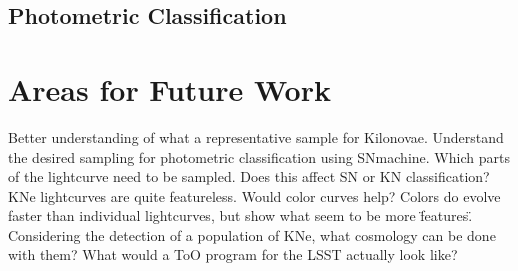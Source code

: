 \documentclass[12pt]{article}
\begin{document}
\subsection{Photometric Classification} %

\section{Areas for Future Work} %
Better understanding of what a representative sample for Kilonovae.
Understand the desired sampling for photometric classification using SNmachine. Which parts of the lightcurve need to be sampled. Does this affect SN or KN classification?
KNe lightcurves are quite featureless. Would color curves help? Colors do evolve faster than individual lightcurves, but show what seem to be more \"features\".
Considering the detection of a population of KNe, what cosmology can be done with them?
What would a ToO program for the LSST actually look like?

\newpage


\end{document}
